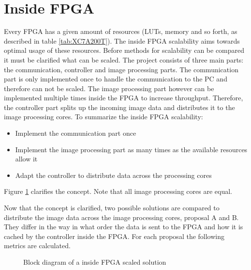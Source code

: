 \section{Inside FPGA} \label{chapt:sca:inside}
Every FPGA has a given amount of resources (LUTs, memory and so forth, as
described in table \ref{tab:XC7A200T}). The inside FPGA scalability aims towards
optimal usage of these resources. Before methods for scalability can be
compared it must be clarified what can be scaled. The project
consists of three main parts: the communication, controller and image processing
parts. The communication part is only implemented once to handle the
communication to the PC and therefore can not be scaled. The image processing
part however can be implemented multiple times inside the FPGA to increase
throughput. Therefore, the controller part splits up the incoming image data and
distributes it to the image processing cores. To summarize the inside FPGA
scalability:
\begin{itemize}
    \item Implement the communication part once
    \item Implement the image processing part as many times as the available
    resources allow it
    \item Adapt the controller to distribute data across the processing cores
\end{itemize}

Figure \ref{fig:insidefpgascaleconceptbd} clarifies the concept. Note that all
image processing cores are equal.

Now that the concept is clarified, two possible solutions are compared to
distribute the image data across the image processing cores, proposal A and B.
They differ in the way in what order the data is sent to the FPGA and how it is
cached by the controller inside the FPGA. For each proposal the following
metrics are calculated.

\begin{figure}[h!]
    \centering
    \begin{adjustbox}{max height=5cm}
        
    \end{adjustbox}
    \caption{Block diagram of a inside FPGA scaled solution}
    \label{fig:insidefpgascaleconceptbd}
\end{figure}

\clearpage

